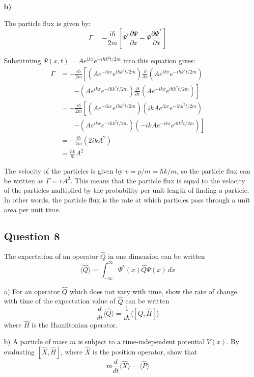 \documentclass{article}
\begin{document}
\textbf{b)} 

The particle flux is given by:
\begin{equation*}
\Gamma = -\frac{i \hbar}{2m} \left[ \Psi^* \frac{\partial \Psi}{\partial x} - \Psi \frac{\partial \Psi^*}{\partial x} \right]
\end{equation*}

Substituting $\Psi(x,t) = Ae^{ikx} e^{-i \hbar k^2 t / 2m}$ into this equation gives:
\begin{align*}
\Gamma &= -\frac{i \hbar}{2m} \left[ (Ae^{-ikx} e^{i \hbar k^2 t / 2m}) \frac{\partial}{\partial x} (Ae^{ikx} e^{-i \hbar k^2 t / 2m}) \right. \\
&\qquad \left. - (Ae^{ikx} e^{-i \hbar k^2 t / 2m}) \frac{\partial}{\partial x} (Ae^{-ikx} e^{i \hbar k^2 t / 2m}) \right] \\
&= -\frac{i \hbar}{2m} \left[ (Ae^{-ikx} e^{i \hbar k^2 t / 2m})(ikAe^{ikx} e^{-i \hbar k^2 t / 2m}) \right. \\
&\qquad \left. - (Ae^{ikx} e^{-i \hbar k^2 t / 2m})(-ikAe^{-ikx} e^{i \hbar k^2 t / 2m}) \right] \\
&= -\frac{i \hbar}{2m} (2ikA^2) \\
&= \frac{\hbar k}{m} A^2
\end{align*}

The velocity of the particles is given by $v = p/m = \hbar k / m$, so the particle flux can be written as $\Gamma = v A^2$. This means that the particle flux is equal to the velocity of the particles multiplied by the probability per unit length of finding a particle. In other words, the particle flux is the rate at which particles pass through a unit area per unit time.


\subsection{Question 8} 
The expectation of an operator $\hat{Q}$ in one dimension can be written  
\[
\langle \hat{Q} \rangle = \int_{-\infty}^{\infty} \Psi^*(x) \hat{Q} \Psi(x) \, dx
\]

a) For an operator $\hat{Q}$ which does not vary with time, show the rate of change with time of the expectation value of $\hat{Q}$ can be written  
\[
\frac{d}{dt} \langle \hat{Q} \rangle = \frac{1}{i\hbar} \langle [\hat{Q}, \hat{H}] \rangle
\]  
where $\hat{H}$ is the Hamiltonian operator.

b) A particle of mass $m$ is subject to a time-independent potential $V(x)$. By evaluating $[\hat{X}, \hat{H}]$, where $\hat{X}$ is the position operator, show that  
\[
m \frac{d}{dt} \langle \hat{X} \rangle = \langle \hat{P} \rangle
\]
\end{document}
